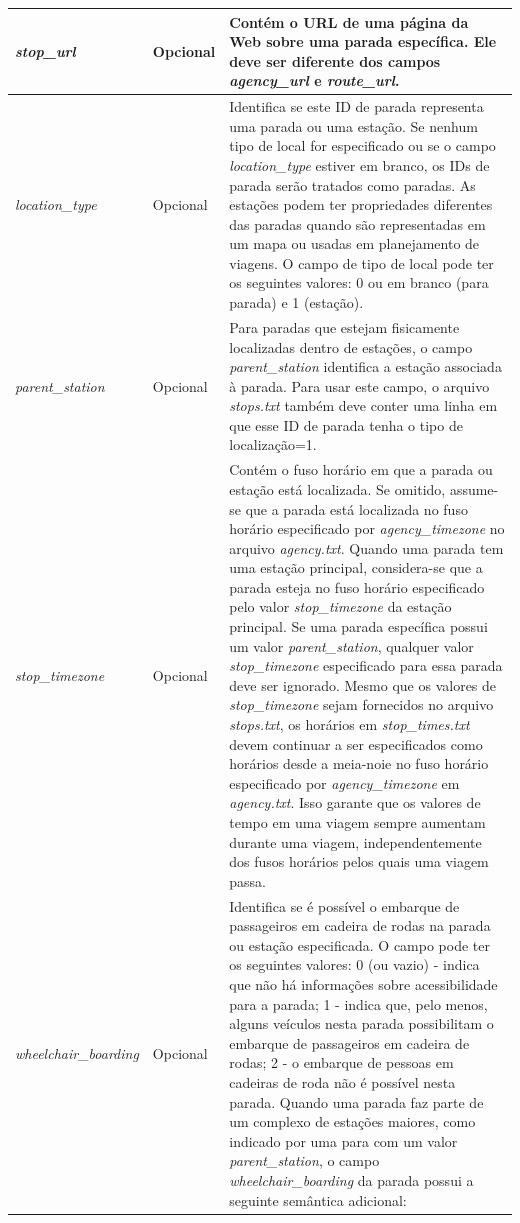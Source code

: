 \documentclass[
	12pt,				%
	oneside,			%
	a4paper,			%
	english,			%
	brazil				%
	]{abntex2ppgsi}
\begin{document}
{{\begin{apendicesenv}
\begin{longtable}[!htb]{>{\centering\arraybackslash}m{3.8cm} | >{\centering}m{2.5cm} | >{\centering\arraybackslash}m{8.5cm}}
\hline
\textit{stop\_url} & Opcional & Contém o URL de uma página da Web sobre uma parada específica. Ele deve ser diferente dos campos \textit{agency\_url} e \textit{route\_url}. \\
\hline
\textit{location\_type} & Opcional & Identifica se este ID de parada representa uma parada ou uma estação. Se nenhum tipo de local for especificado ou se o campo \textit{location\_type} estiver em branco, os IDs de parada serão tratados como paradas. As estações podem ter propriedades diferentes das paradas quando são representadas em um mapa ou usadas em planejamento de viagens. O campo de tipo de local pode ter os seguintes valores: 0 ou em branco (para parada) e 1 (estação). \\
\hline
\textit{parent\_station} & Opcional & Para paradas que estejam fisicamente localizadas dentro de estações, o campo \textit{parent\_station} identifica a estação associada à parada. Para usar este campo, o arquivo \textit{stops.txt} também deve conter uma linha em que esse ID de parada tenha o tipo de localização=1. \\
\hline
\textit{stop\_timezone} & Opcional & Contém o fuso horário em que a parada ou estação está localizada. Se omitido, assume-se que a parada está localizada no fuso horário especificado por \textit{agency\_timezone} no arquivo \textit{agency.txt}.
Quando uma parada tem uma estação principal, considera-se que a parada esteja no fuso horário especificado pelo valor \textit{stop\_timezone} da estação principal. Se uma parada específica possui um valor \textit{parent\_station}, qualquer valor \textit{stop\_timezone} especificado para essa parada deve ser ignorado. Mesmo que os valores de \textit{stop\_timezone} sejam fornecidos no arquivo \textit{stops.txt}, os horários em \textit{stop\_times.txt} devem continuar a ser especificados como horários desde a meia-noie no fuso horário especificado por \textit{agency\_timezone} em \textit{agency.txt}. Isso garante que os valores de tempo em uma viagem sempre aumentam durante uma viagem, independentemente dos fusos horários pelos quais uma viagem passa. \\
\hline
\textit{wheelchair\_boarding} & Opcional & Identifica se é possível o embarque de passageiros em cadeira de rodas na parada ou estação especificada. O campo pode ter os seguintes valores:
0 (ou vazio) - indica que não há informações sobre acessibilidade para a parada; 1 - indica que, pelo menos, alguns veículos nesta parada possibilitam o embarque de passageiros em cadeira de rodas; 2 - o embarque de pessoas em cadeiras de roda não é possível nesta parada. Quando uma parada faz parte de um complexo de estações maiores, como indicado por uma para com um valor \textit{parent\_station}, o campo \textit{wheelchair\_boarding} da parada possui a seguinte semântica adicional:

\end{longtable}
\end{apendicesenv}}}
\end{document}
